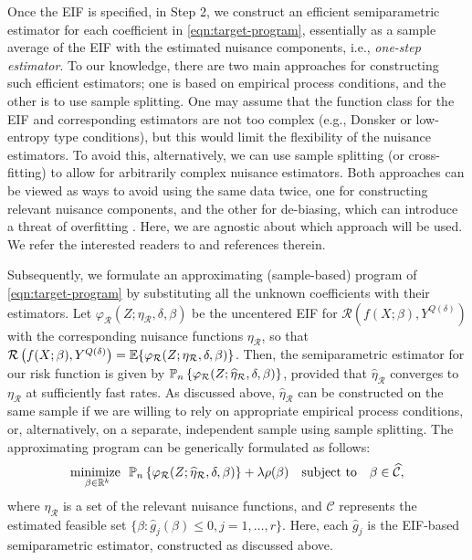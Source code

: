 Once the EIF is specified, in Step 2, we construct an efficient semiparametric estimator for each coefficient in \eqref{eqn:target-program}, essentially as a sample average of the EIF with the estimated nuisance components, i.e., \emph{one-step estimator}. To our knowledge, there are two main approaches for constructing such efficient estimators; one is based on empirical process conditions, and the other is to use sample splitting. One may assume that the function class for the EIF and corresponding estimators are not too complex (e.g., Donsker or low-entropy type conditions), but this would limit the flexibility of the nuisance estimators. To avoid this, alternatively, we can use sample splitting (or cross-fitting) to allow for arbitrarily complex nuisance estimators. Both approaches can be viewed as ways to avoid using the same data twice, one for constructing
relevant nuisance components, and the other for de-biasing, which can introduce a threat of overfitting \citep{Chernozhukov18}. Here, we are agnostic about which approach will be used. We refer the interested readers to \citet{kennedy2016semiparametric,kennedy2022semiparametric} and references therein.

Subsequently, we formulate an approximating (sample-based) program of \eqref{eqn:target-program} by substituting all the unknown coefficients with their estimators. Let $\varphi_{\mathcal{R}}(Z;\eta_{\mathcal{R}},\delta,\beta)$ be the uncentered EIF for $\mathcal{R}\left( f(X;\beta), Y^{Q(\delta)} \right)$ with the corresponding nuisance functions $\eta_{\mathcal{R}}$, so that $\mathcal{R}\left( f(X;\beta), Y^{Q(\delta)} \right) = \mathbb{E}\{\varphi_{\mathcal{R}}(Z;\eta_{\mathcal{R}},\delta,\beta)\}$. Then, the semiparametric estimator for our risk function is given by $\mathbb{P}_n\left\{ \varphi_{\mathcal{R}}(Z;\widehat{\eta}_{\mathcal{R}},\delta,\beta)\right\}$, provided that $\widehat{\eta}_{\mathcal{R}}$ converges to $\eta_{\mathcal{R}}$ at sufficiently fast rates. As discussed above, $\widehat{\eta}_{\mathcal{R}}$ can be constructed on the same sample if we are willing to rely on appropriate empirical process conditions, or, alternatively, on a separate, independent sample using sample splitting. The approximating program can be generically formulated as follows:
\begin{align} \label{eqn:approx-program}
\underset{\beta \in \mathbb{R}^k}{\text{minimize }} \,\,  \mathbb{P}_n\left\{ \varphi_{\mathcal{R}}(Z;\widehat{\eta}_{\mathcal{R}},\delta,\beta)\right\} + \lambda \rho(\beta) \quad \text{subject to} \quad \beta \in \widehat{\mathcal{C}},  
\end{align}
where $\eta_{\mathcal{R}}$ is a set of the relevant nuisance functions, and $\widehat{\mathcal{C}}$ represents the estimated feasible set $\{\beta : \widehat{g}_j(\beta) \leq 0, j=1,\ldots,r\}$. Here, each $\widehat{g}_j$ is the EIF-based semiparametric estimator, constructed as discussed above.

